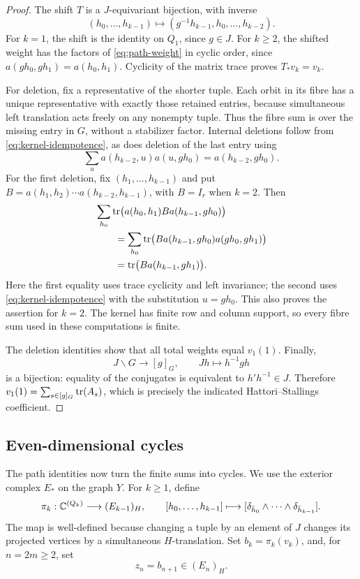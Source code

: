 \begin{proof}
The shift $T$ is a $J$-equivariant bijection, with inverse
\[
 (h_0,\ldots,h_{k-1})\longmapsto
 (g^{-1}h_{k-1},h_0,\ldots,h_{k-2}).
\]
For $k=1$, the shift is the identity on $Q_1$, since $g\in J$.
For $k\ge2$, the shifted weight has the factors of
\eqref{eq:path-weight} in cyclic order, since
$a(gh_0,gh_1)=a(h_0,h_1)$.  Cyclicity of the matrix trace proves
$T_*v_k=v_k$.

For deletion, fix a representative of the shorter tuple.  Each orbit in
its fibre has a unique representative with exactly those retained
entries, because simultaneous left translation acts freely on any
nonempty tuple.  Thus the fibre sum is over the missing entry in $G$,
without a stabilizer factor.  Internal deletions follow from
\eqref{eq:kernel-idempotence}, as does deletion of the last entry using
\[
 \sum_u a(h_{k-2},u)a(u,gh_0)=a(h_{k-2},gh_0).
\]
For the first deletion, fix $(h_1,\ldots,h_{k-1})$ and put
$B=a(h_1,h_2)\cdots a(h_{k-2},h_{k-1})$, with $B=I_r$ when $k=2$.
Then
\begin{align*}
 &\sum_{h_0}\operatorname{tr}\bigl(a(h_0,h_1)B a(h_{k-1},gh_0)\bigr)\\
 &\qquad=\sum_{h_0}\operatorname{tr}\bigl(Ba(h_{k-1},gh_0)a(gh_0,gh_1)\bigr)\\
 &\qquad=\operatorname{tr}\bigl(Ba(h_{k-1},gh_1)\bigr).
\end{align*}
Here the first equality uses trace cyclicity and left invariance; the
second uses \eqref{eq:kernel-idempotence} with the substitution $u=gh_0$.
This also proves the assertion for $k=2$.  The kernel has finite row and
column support, so every fibre sum used in these computations is finite.

The deletion identities show that all total weights equal $v_1(1)$.
Finally,
\[
 J\backslash G\longrightarrow[g]_G,\qquad Jh\longmapsto h^{-1}gh
\]
is a bijection: equality of the conjugates is equivalent to
$h'h^{-1}\in J$.  Therefore
$v_1(1)=\sum_{s\in[g]_G}\operatorname{tr}(A_s)$, which is precisely the indicated
Hattori--Stallings coefficient.
\end{proof}

\subsection{Even-dimensional cycles}

The path identities now turn the finite sums into cycles.  We use the
exterior complex $E_*$ on the graph $Y$.
For $k\ge1$, define
\[
 \pi_k:\mathbb C^{(Q_k)}\longrightarrow(E_{k-1})_H,\qquad
 [h_0,\ldots,h_{k-1}]\longmapsto
 [\delta_{\bar h_0}\wedge\cdots\wedge\delta_{\bar h_{k-1}}].
\]
The map is well-defined because changing a tuple by an element of $J$
changes its projected vertices by a simultaneous $H$-translation.
Set $b_k=\pi_k(v_k)$, and, for $n=2m\ge2$, set
\[
 z_n=b_{n+1}\in(E_n)_H.
\]

